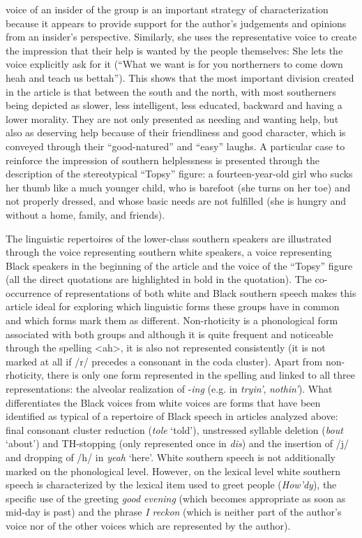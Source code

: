 voice of an insider of the group is an important strategy of characterization because it appears to provide support for the author’s judgements and opinions from an insider’s perspective. Similarly, she uses the representative voice to create the impression that their help is wanted by the people themselves: She lets the voice explicitly ask for it (“What we want is for you northerners to come down heah and teach us bettah”). This shows that the most important division created in the article is that between the south and the north, with most southerners being depicted as slower, less intelligent, less educated, backward and having a lower morality. They are not only presented as needing and wanting help, but also as deserving help because of their friendliness and good character, which is conveyed through their “good-natured” and “easy” laughs. A particular case to reinforce the impression of southern helplessness is presented through the description of the stereotypical “Topsy” figure: a fourteen-year-old girl who sucks her thumb like a much younger child, who is barefoot (she turns on her toe) and not properly dressed, and whose basic needs are not fulfilled (she is hungry and without a home, family, and friends).

The linguistic repertoires of the lower-class southern speakers are illustrated through the voice representing southern white speakers, a voice representing Black speakers in the beginning of the article and the voice of the “Topsy” figure (all the direct quotations are highlighted in bold in the quotation). The co-occurrence of representations of both white and Black southern speech makes this article ideal for exploring which linguistic forms these groups have in common and which forms mark them as different. Non-rhoticity is a phonological form associated with both groups and although it is quite frequent and noticeable through the spelling <ah>, it is also not represented consistently (it is not marked at all if /r/ precedes a consonant in the coda cluster). Apart from non-rhoticity, there is only one form represented in the spelling and linked to all three representations: the alveolar realization of -\emph{ing} (e.g. in \emph{tryin’}, \emph{nothin’}). What differentiates the Black voices from white voices are forms that have been identified as typical of a repertoire of Black speech in articles analyzed above: final consonant cluster reduction (\emph{tole} ‘told’), unstressed syllable deletion (\emph{bout} ‘about’) and TH-stopping (only represented once in \emph{dis}) and the insertion of /j/ and dropping of /h/ in \emph{yeah} ‘here’. White southern speech is not additionally marked on the phonological level. However, on the lexical level white southern speech is characterized by the lexical item used to greet people (\emph{How’dy}), the specific use of the greeting \emph{good evening} (which becomes appropriate as soon as mid-day is past) and the phrase \emph{I reckon} (which is neither part of the author’s voice nor of the other voices which are represented by the author).

